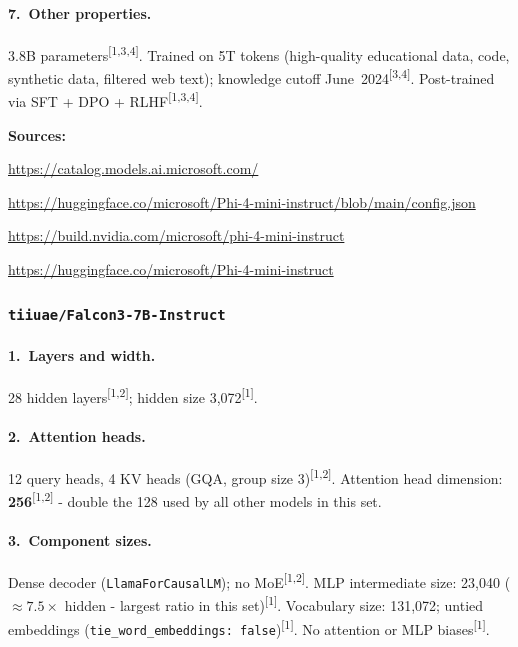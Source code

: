 \documentclass[11pt, a4paper]{article}
\newcommand{\src}[1]{\textsuperscript{\normalfont\small[#1]}}
\begin{document}
\paragraph{7.~Other properties.}
3.8B parameters\src{1,3,4}.
Trained on 5T tokens (high-quality educational data, code, synthetic data,
filtered web text); knowledge cutoff June~2024\src{3,4}.
Post-trained via SFT + DPO + RLHF\src{1,3,4}.

\noindent\textbf{Sources:}
\begin{enumerate}[noitemsep,label=\small{[\arabic*]},leftmargin=*,topsep=2pt]
\item \small\url{https://catalog.models.ai.microsoft.com/}
\item \small\url{https://huggingface.co/microsoft/Phi-4-mini-instruct/blob/main/config.json}
\item \small\url{https://build.nvidia.com/microsoft/phi-4-mini-instruct}
\item \small\url{https://huggingface.co/microsoft/Phi-4-mini-instruct}
\end{enumerate}

\subsubsection{\texttt{tiiuae/Falcon3-7B-Instruct}}

\paragraph{1.~Layers and width.}
28 hidden layers\src{1,2}; hidden size 3,072\src{1}.

\paragraph{2.~Attention heads.}
12 query heads, 4 KV heads (GQA, group size 3)\src{1,2}.
Attention head dimension: \textbf{256}\src{1,2} - double the 128 used by all
other models in this set.

\paragraph{3.~Component sizes.}
Dense decoder (\texttt{LlamaForCausalLM}); no MoE\src{1,2}.
MLP intermediate size: 23,040 ($\approx7.5\times$ hidden - largest ratio in this
set)\src{1}.
Vocabulary size: 131,072; untied embeddings
(\texttt{tie\_word\_embeddings: false})\src{1}.
No attention or MLP biases\src{1}.
\end{document}
